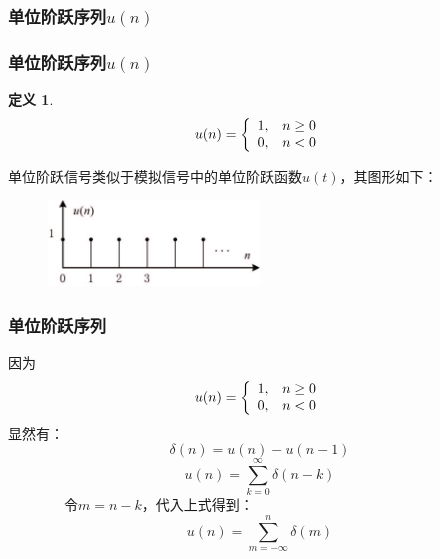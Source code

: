 \documentclass[notheorems,compress,mathserif,table]{beamer}
\newtheorem{definition}{定义}
\begin{document}
\subsubsection*{单位阶跃序列$u(n)$}
\begin{frame}[shrink]\frametitle{单位阶跃序列$u(n)$}%
\begin{definition}
\begin{equation*}
     u(n)= \left\{\begin{array}
     {r@{,\quad}l}
     1&\mbox{$n\geq0$}\\0&\mbox{$n<0$}
    \end{array} \right.
\end{equation*}
\end{definition}
单位阶跃信号类似于模拟信号中的单位阶跃函数$u(t)$，其图形如下：
\begin{figure}[h]
  \centering
  \includegraphics[width=0.50\textwidth]{danweijieyue.jpg}
\end{figure}

\end{frame}
%
%
%
%
%
%
\begin{frame}\frametitle{单位阶跃序列}%
因为
\begin{equation*}\label{fol:delta}
     u(n)= \left\{\begin{array}
     {r@{,\quad}l}
     1&\mbox{$n\geq0$}\\0&\mbox{$n<0$}
    \end{array} \right.
\end{equation*}
显然有：%
\begin{equation*}%
    \delta(n)= u(n)-u(n-1)
\end{equation*}
\vspace{-0.5cm}
\begin{equation*}%
    u(n)= \sum_{k=0}^{\infty}\delta(n-k)
\end{equation*}
$\quad\quad\quad\quad$令$m=n-k$，代入上式得到：
\begin{equation*}%
    u(n)= \sum_{m=-\infty}^{n}\delta(m)
\end{equation*}
\end{frame}
%
%
%
%
%
%
\end{document}
